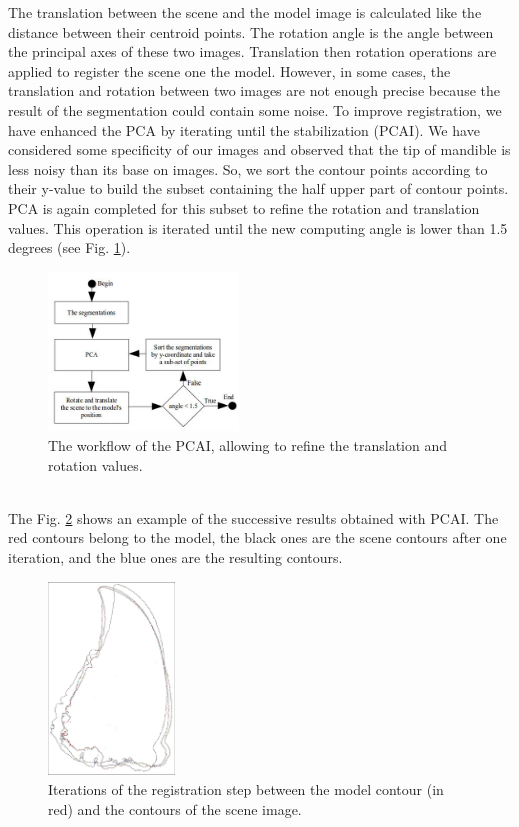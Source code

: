 \documentclass[twoside,twocolumn,10pt]{article}
\begin{document}
The translation between the scene and the model image is calculated like the distance between their centroid
points. The rotation angle is the angle between the principal axes of
these two images. Translation then rotation operations are applied to register the scene one the model. However, in some cases, the translation and rotation between two images are
not enough precise because the result of the segmentation could contain some noise.
To improve registration, we have enhanced the PCA by iterating until
the stabilization (PCAI).
We have considered some specificity of our images and observed that the tip of mandible is less noisy than its base on images.
So, we sort the contour points according to their y-value to build the subset containing the half upper part of contour points.
PCA is again completed for this subset to refine the rotation and translation values. This operation is iterated until the new computing angle is lower than 1.5 degrees (see Fig. \ref{fig:pcai}).
\begin{figure}[htb]
    \centering
    \includegraphics[width=0.45\textwidth]{./images/pcadiagram}
    \caption{The workflow of the PCAI, allowing to refine the translation and rotation values.}
    \label{fig:pcai}
\end{figure}~\\
The Fig. \ref{fig:box} shows an example of the successive results obtained with PCAI. The red contours belong to the model, the black ones are the scene contours after one iteration, and the blue ones are the resulting contours.\\

\begin{figure}[htb]
    \centering
    \includegraphics[width=0.3\textwidth]{./images/imreg}
    \caption{Iterations of the registration step between the model contour (in red) and the contours of the scene image.}
    \label{fig:box}
\end{figure}
\end{document}

